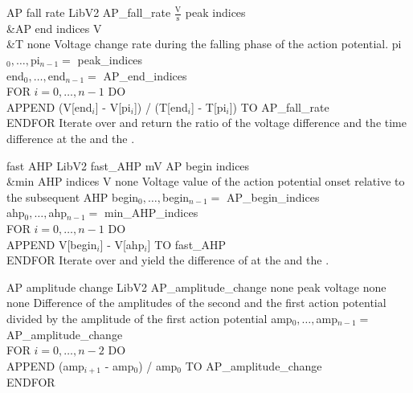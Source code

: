 \begin{efeature}
  {AP fall rate}
  {LibV2}
  {AP\_fall\_rate}
  {$\frac{\mathrm{V}}{\mathrm{s}}$}
  {peak indices\\&AP end indices}
  {V\\&T}
  {none}
  {Voltage change rate during the falling phase of the action potential.}
  {
  pi$_0, \ldots, $pi$_{n-1} =$ peak\_indices \\
  end$_0, \ldots, $end$_{n-1} =$ AP\_end\_indices \\
  FOR $i = 0, \dots, n - 1$ DO \+ \\
    APPEND (V[end$_i$] - V[pi$_i$]) / (T[end$_i$] - T[pi$_i$]) TO AP\_fall\_rate \- \\
  ENDFOR
  }
  Iterate over  and return the ratio of the voltage difference and the time difference at the  and the .
  
\end{efeature}

\begin{efeature}
  {fast AHP}
  {LibV2}
  {fast\_AHP}
  {mV}
  {AP begin indices\\&min AHP indices}
  {V}
  {none}
  {Voltage value of the action potential onset relative to the subsequent AHP}
  {
  begin$_0, \ldots, $begin$_{n-1} =$ AP\_begin\_indices \\
  ahp$_0, \ldots, $ahp$_{n-1} =$ min\_AHP\_indices \\
  FOR $i = 0, \dots, n - 1$ DO \+ \\
    APPEND V[begin$_i$] - V[ahp$_i$] TO fast\_AHP \- \\
  ENDFOR
  }
  Iterate over  and yield the difference of  at the  and the .
  
\end{efeature}

\begin{efeature}
  {AP amplitude change}
  {LibV2}
  {AP\_amplitude\_change}
  {none}
  {peak voltage}
  {none}
  {none}
  {Difference of the amplitudes of the second and the first action potential divided by the amplitude of the first action potential}
  {
  amp$_0, \ldots, $amp$_{n-1} =$ AP\_amplitude\_change \\
  FOR $i = 0, \dots, n - 2$ DO \+ \\
    APPEND (amp$_{i+1}$ - amp$_0$) / amp$_0$ TO AP\_amplitude\_change \- \\
  ENDFOR
  }
  
\end{efeature}

